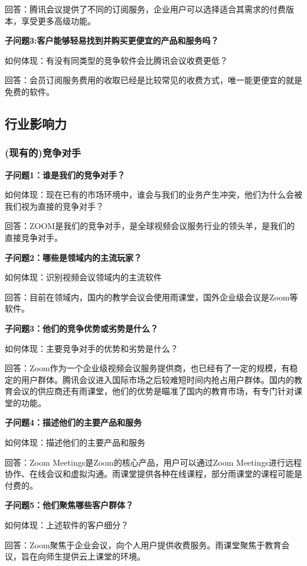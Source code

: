\documentclass[a4paper,12pt]{article}
\begin{document}
    回答：腾讯会议提供了不同的订阅服务，企业用户可以选择适合其需求的付费版本，享受更多高级功能。
    
    \textbf{子问题3:客户能够轻易找到并购买更便宜的产品和服务吗？}

    如何体现：有没有同类型的竞争软件会比腾讯会议收费更低？

    回答：会员订阅服务费用的收取已经是比较常见的收费方式，唯一能更便宜的就是免费的软件。
    
    \subsection{行业影响力}
    \subsubsection{(现有的)竞争对手}
    \textbf{子问题1：谁是我们的竞争对手？}

    如何体现：现在已有的市场环境中，谁会与我们的业务产生冲突，他们为什么会被我们视为直接的竞争对手？

    回答：ZOOM是我们的竞争对手，是全球视频会议服务行业的领头羊，是我们的直接竞争对手。
    

    \textbf{子问题2：哪些是领域内的主流玩家？}

    如何体现：识别视频会议领域内的主流软件

    回答：目前在领域内，国内的教学会议会使用雨课堂，国外企业级会议是Zoom等软件。
    
    \textbf{子问题3：他们的竞争优势或劣势是什么？}

    如何体现：主要竞争对手的优势和劣势是什么？

    回答：Zoom作为一个企业级视频会议服务提供商，也已经有了一定的规模，有稳定的用户群体。腾讯会议进入国际市场之后较难短时间内抢占用户群体。国内的教育会议的供应商还有雨课堂，他们的优势是瞄准了国内的教育市场，有专门针对课堂的功能。
    
    \textbf{子问题4：描述他们的主要产品和服务}

    如何体现：描述他们的主要产品和服务

    回答：Zoom Meetings是Zoom的核心产品，用户可以通过Zoom Meetings进行远程协作、在线会议和虚拟沟通。雨课堂提供各种在线课程，部分雨课堂的课程可能是付费的。
    
    \textbf{子问题5：他们聚焦哪些客户群体？}

    如何体现：上述软件的客户细分？

    回答：Zoom聚焦于企业会议，向个人用户提供收费服务。雨课堂聚焦于教育会议，旨在向师生提供云上课堂的环境。
    
\end{document}
